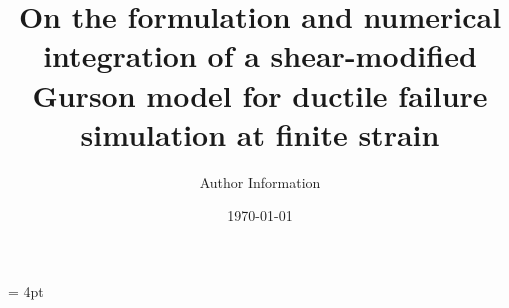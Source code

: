 \documentclass[11pt]{article}
\theoremstyle{remark}
\begin{document}
\setlength{\headheight}{15pt}
\headsep = 4pt

\title{On the formulation and numerical integration of a shear-modified Gurson model for ductile failure simulation at finite strain}

    \author{
     Author Information \\
	 }

\date{\today}

\maketitle

    \begin{abstract}
	
    \end{abstract}

    
    
    
    
    
    




\end{document}
